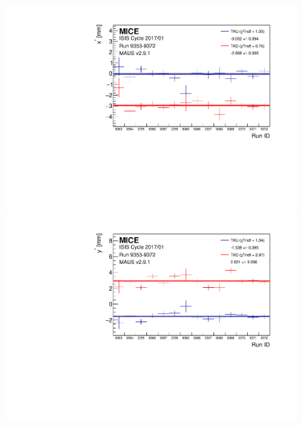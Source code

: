 \begin{figure} [!htb]
	\centering
	\begin{minipage}[b]{.49\textwidth}
		\centering
		\includegraphics[width=\textwidth]{data_final/x_bestfit.pdf}
	\end{minipage}
	\hfill
	\begin{minipage}[b]{.49\textwidth}
		\centering
		\includegraphics[width=\textwidth]{data_final/y_bestfit.pdf}
	\end{minipage}
	

\end{figure}
